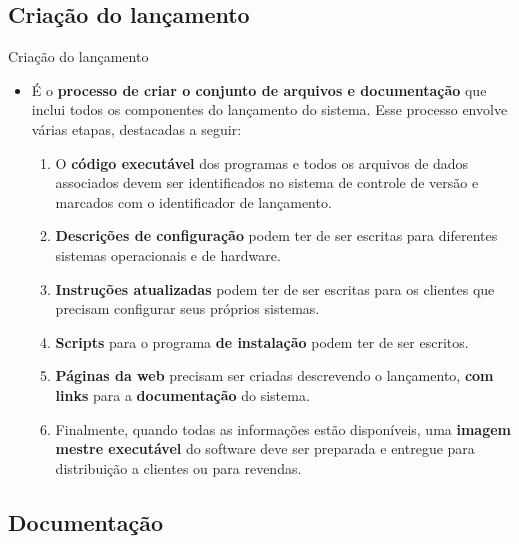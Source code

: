 \documentclass{beamer}
\begin{document}
\subsection{Criação do lançamento}

\begin{frame}{Criação do lançamento}
	\begin{itemize}
		\justifying
		\item É o \textbf{processo de criar o conjunto de arquivos e documentação} que inclui todos os componentes do lançamento do sistema. Esse processo envolve várias etapas, destacadas a seguir:
		\begin{enumerate}
			\justifying
			\item<2> O \textbf{código executável} dos programas e todos os arquivos de dados associados devem ser identificados no sistema de controle de versão e marcados com o identificador de lançamento.
			\item<3> \textbf{Descrições de configuração} podem ter de ser escritas para diferentes sistemas operacionais e de hardware.
			\item<4> \textbf{Instruções atualizadas} podem ter de ser escritas para os clientes que precisam configurar seus próprios sistemas.
			\item<5> \textbf{Scripts} para o programa \textbf{de instalação} podem ter de ser escritos.
			\item<6> \textbf{Páginas da web} precisam ser criadas descrevendo o lançamento, \textbf{com links} para a \textbf{documentação} do sistema.
			\item<7> Finalmente, quando todas as informações estão disponíveis, uma \textbf{imagem mestre executável} do software deve ser preparada e entregue para distribuição a clientes ou para revendas.
		\end{enumerate}
	\end{itemize}
\end{frame}

\subsection{Documentação}
\end{document}

